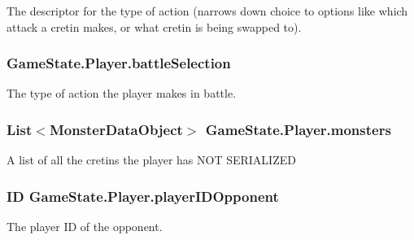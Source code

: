 The descriptor for the type of action (narrows down choice to options like which attack a cretin makes, or what cretin is being swapped to). 

\hypertarget{struct_game_state_1_1_player_a123c8ee2ef6e66e88bcca1a80f73ab4a}{
\subsubsection[{battle\-Selection}]{ Game\-State.\-Player.\-battle\-Selection}}\label{struct_game_state_1_1_player_a123c8ee2ef6e66e88bcca1a80f73ab4a}


The type of action the player makes in battle. 

\hypertarget{struct_game_state_1_1_player_a4412b3835e68a55b00610438118cdb16}{
\subsubsection[{monsters}]{\setlength{\rightskip}{0pt plus 5cm}List$<${\bf Monster\-Data\-Object}$>$ Game\-State.\-Player.\-monsters}}\label{struct_game_state_1_1_player_a4412b3835e68a55b00610438118cdb16}


A list of all the cretins the player has N\-O\-T S\-E\-R\-I\-A\-L\-I\-Z\-E\-D 

\hypertarget{struct_game_state_1_1_player_aaed188c94b7f6be4dabe39744aa818ca}{
\subsubsection[{player\-I\-D\-Opponent}]{\setlength{\rightskip}{0pt plus 5cm}I\-D Game\-State.\-Player.\-player\-I\-D\-Opponent}}\label{struct_game_state_1_1_player_aaed188c94b7f6be4dabe39744aa818ca}


The player I\-D of the opponent. 

